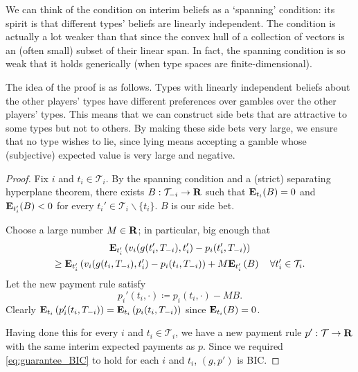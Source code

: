 \documentclass[11pt,letterpaper,reqno,oneside]{article}
\begin{document}
We can think of the condition on interim beliefs as a `spanning' condition: its spirit is that different types' beliefs are linearly independent. The condition is actually a lot weaker than that since the convex hull of a collection of vectors is an (often small) subset of their linear span. In fact, the spanning condition is so weak that it holds generically (when type spaces are finite-dimensional).

The idea of the proof is as follows. Types with linearly independent beliefs about the other players' types have different preferences over gambles over the other players' types. This means that we can construct side bets that are attractive to some types but not to others. By making these side bets very large, we ensure that no type wishes to lie, since lying means accepting a gamble whose (subjective) expected value is very large and negative.
%
\begin{proof}
	Fix $i$ and $t_i \in \mathcal{T}_i$. By the spanning condition and a (strict) separating hyperplane theorem, there exists $B : \mathcal{T}_{-i} \to \mathbf{R}$ such that $\mathbf{E}_{t_i}(B) = 0$ and $\mathbf{E}_{t_i'}(B) < 0$ for every $t_i' \in \mathcal{T}_i \backslash \{t_i\}$. $B$ is our side bet.

	Choose a large number $M \in \mathbf{R}$; in particular, big enough that
	\begin{multline}
		\mathbf{E}_{t_i'}\left(
		v_i( g(t_i',T_{-i}), t_i' ) - p_i(t_i',T_{-i})
		\right)
		\\
		\geq
		\mathbf{E}_{t_i'}\left(
		v_i( g(t_i,T_{-i}), t_i' ) - p_i(t_i,T_{-i})
		\right) 
		+ M \mathbf{E}_{t_i'}\left( B \right) 
		\quad\forall t_i' \in \mathcal{T}_i .
		\label{eq:guarantee_BIC}
	\end{multline}
	Let the new payment rule satisfy
	\begin{equation*}
		p_i'(t_i,\cdot) \coloneqq p_i(t_i,\cdot) - M B .
	\end{equation*}
	Clearly $\mathbf{E}_{t_i}\left( p_i'(t_i,T_{-i}) \right) = \mathbf{E}_{t_i}\left( p_i(t_i,T_{-i}) \right)$ since $\mathbf{E}_{t_i}(B)=0$.

	Having done this for every $i$ and $t_i \in \mathcal{T}_i$, we have a new payment rule $p' : \mathcal{T} \to \mathbf{R}$ with the same interim expected payments as $p$. Since we required \eqref{eq:guarantee_BIC} to hold for each $i$ and $t_i$, $(g,p')$ is BIC.
\end{proof}
\end{document}
